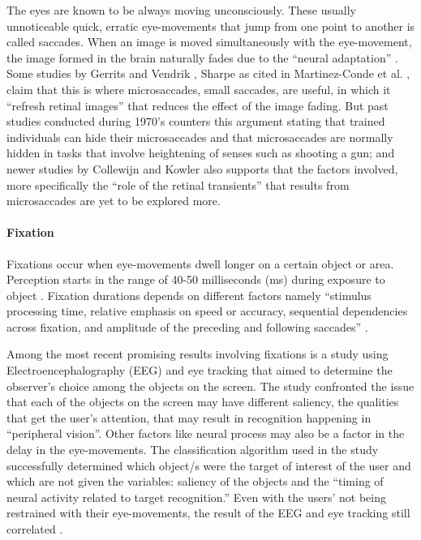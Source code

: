 \documentclass[journal]{./IEEE/IEEEtran}
\begin{document}
The eyes are known to be always moving unconsciously. These usually unnoticeable quick, erratic eye-movements that jump from one point to another is called saccades. When an image is moved simultaneously with the eye-movement, the image formed in the brain naturally fades due to the “neural adaptation”  \cite{martinez-conde_macknik_troncoso_dyar_2006}. Some studies  by Gerrits and Vendrik  \cite {gerrits_vendrik_1970}, Sharpe  \cite{sharpe_1972} as cited in Martinez-Conde  et al.  \cite{martinez-conde_macknik_troncoso_dyar_2006}, claim that this is where microsaccades, small saccades, are useful, in which it “refresh retinal images” that reduces the effect of the image fading. But past studies conducted during 1970’s counters this argument stating that trained individuals can hide their microsaccades and that microsaccades are normally hidden in tasks that involve heightening of senses such as shooting a gun; and newer studies by Collewijn and Kowler \cite{collewijn_kowler_2008} also supports that the factors involved, more specifically the “role of the retinal transients” that results from microsaccades are yet to be explored more. 


\paragraph {Fixation} \leavevmode

Fixations occur when eye-movements dwell longer on a certain object or area. Perception starts in the range of 40-50 milliseconds (ms) during exposure to object \cite{rayner_smith_malcolm_henderson_2009}. Fixation durations depends on different factors namely “stimulus processing time, relative emphasis on speed or accuracy, sequential dependencies across fixation, and amplitude of the preceding and following saccades”  \cite{salthouse_ellis_1980}. 

Among the most recent promising results involving fixations is a study using Electroencephalography (EEG) and eye tracking that aimed to determine the observer’s choice among the objects on the screen. The study confronted the issue that each of the objects on the screen may have different saliency, the qualities that get the user’s attention, that may result in recognition happening in “peripheral vision”. Other factors like neural process may also be a factor in the delay in the eye-movements. The classification algorithm used in the study successfully determined which object/s were the target of interest of the user and which are not given the variables: saliency of the objects and the “timing of neural activity related to target recognition.” Even with the users’ not being restrained with their eye-movements, the result of the EEG and eye tracking still correlated \cite{wenzel_golenia_blankertz_2016}. 
\end{document}
